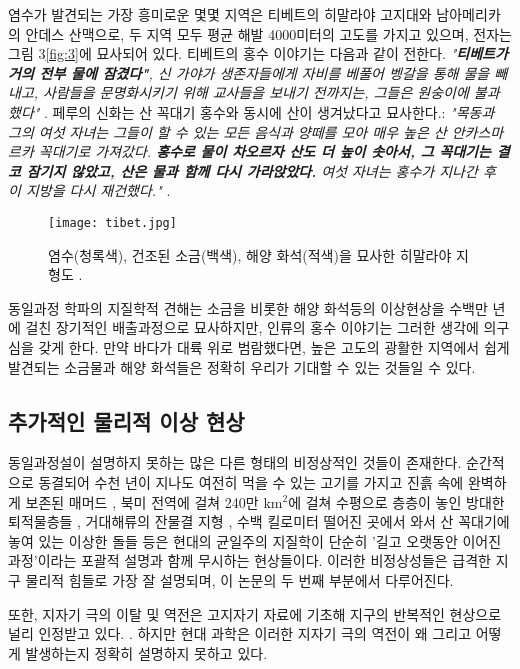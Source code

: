 \documentclass[10pt,twocolumn,letterpaper]{article}
\begin{document}
염수가 발견되는 가장 흥미로운 몇몇 지역은  티베트의 히말라야 고지대와 남아메리카의 안데스 산맥으로, 두 지역 모두 평균 해발 4000미터의 고도를 가지고 있으며, 전자는 그림 3\ref{fig:3}에 묘사되어 있다. 티베트의 홍수 이야기는 다음과 같이 전한다. \textit{"\textbf{티베트가 거의 전부 물에 잠겼다"}, 신 가야가 생존자들에게 자비를 베풀어 벵갈을 통해 물을 빼내고, 사람들을 문명화시키기 위해 교사들을 보내기 전까지는, 그들은 원숭이에 불과했다"} \cite{3}. 페루의 신화는 산 꼭대기 홍수와 동시에 산이 생겨났다고 묘사한다.: \textit{"목동과 그의 여섯 자녀는 그들이 할 수 있는 모든 음식과 양떼를 모아 매우 높은 산 안카스마르카 꼭대기로 가져갔다. \textbf{홍수로 물이 차오르자  산도 더 높이 솟아서, 그 꼭대기는 결코 잠기지 않았고, 산은 물과 함께 다시 가라앉았다.} 여섯 자녀는 홍수가 지나간 후  이 지방을 다시 재건했다."} \cite{3}.

\begin{figure}[t]
\begin{center}
   \texttt{[image: tibet.jpg]}
\end{center}
   \caption{염수(청록색), 건조된 소금(백색), 해양 화석(적색)을 묘사한 히말라야 지형도 \cite{15,16,86,87}.}
\label{fig:3}
\label{fig:onecol}
\end{figure}

동일과정 학파의 지질학적 견해는 소금을 비롯한 해양 화석등의 이상현상을 수백만 년에 걸친 장기적인 배출과정으로 묘사하지만, 인류의 홍수 이야기는 그러한 생각에 의구심을 갖게 한다. 만약 바다가 대륙 위로 범람했다면, 높은 고도의 광활한 지역에서 쉽게 발견되는 소금물과 해양 화석들은 정확히 우리가 기대할 수 있는 것들일 수 있다.

\subsection{추가적인 물리적 이상 현상 }

동일과정설이 설명하지 못하는 많은 다른 형태의 비정상적인 것들이 존재한다. 순간적으로 동결되어 수천 년이 지나도 여전히 먹을 수 있는 고기를 가지고 진흙 속에 완벽하게 보존된 매머드 \cite{17,18,19}, 북미 전역에 걸쳐 240만 km$^2$에 걸쳐 수평으로 층층이 놓인 방대한 퇴적물층들  \cite{21}, 거대해류의 잔물결 지형 \cite{22}, 수백 킬로미터 떨어진 곳에서 와서 산 꼭대기에 놓여 있는 이상한 돌들  \cite{23,26} 등은 현대의 균일주의 지질학이 단순히 '길고 오랫동안 이어진 과정'이라는 포괄적 설명과 함께  무시하는 현상들이다. 이러한 비정상성들은 급격한 지구 물리적 힘들로 가장 잘 설명되며, 이 논문의 두 번째 부분에서 다루어진다.

또한, 지자기 극의 이탈 및 역전은 고지자기 자료에 기초해 지구의 반복적인 현상으로 널리 인정받고 있다. \cite{35,40,41}. 하지만 현대 과학은 이러한 지자기 극의 역전이 왜 그리고 어떻게 발생하는지 정확히 설명하지 못하고 있다.
\end{document}
